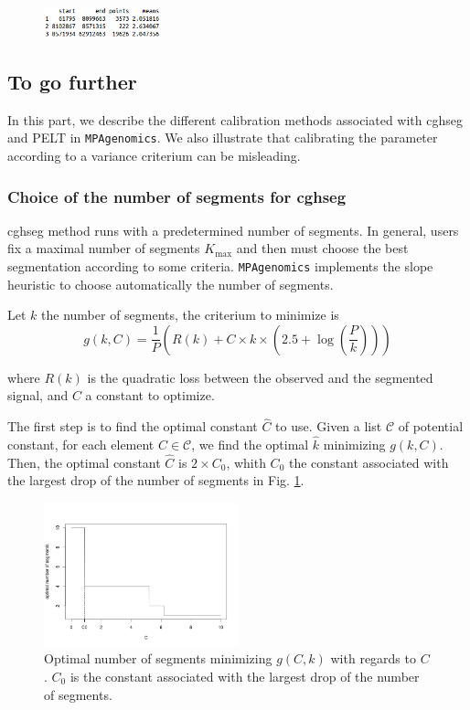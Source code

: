 \documentclass[a4paper,10pt]{article}
\begin{document}
		\begin{figure}[!h]
			\includegraphics[width=0.3\textwidth]{fig/outpelt2}
		\end{figure}
		
		
    \subsection{To go further}
      \label{sec:togo}
        In this part, we describe the different calibration methods associated with cghseg and PELT in \texttt{MPAgenomics}. We also illustrate that calibrating the parameter according to a variance criterium can be misleading.
        
  
      \subsubsection{Choice of the number of segments for cghseg}
        cghseg method runs with a predetermined number of segments. In general, users fix a maximal number of segments $K_{\max}$ and then must choose the best segmentation according to some criteria. \texttt{MPAgenomics} implements the slope heuristic \cite{heurpente} to choose automatically the number of segments. 
      
        Let $k$ the number of segments, the criterium \cite{penseg} to minimize is 
        $$g(k,C)=\frac{1}{P}\left(R(k)+C\times k \times \left(2.5+\log(\frac{P}{k})\right)\right) $$
      
        where $R(k)$ is the quadratic loss between the observed and the segmented signal, and $C$ a constant to optimize.
      
        The first step is to find the optimal constant $\hat{C}$ to use. Given a list $\mathcal{C}$ of potential constant, for each element $C\in\mathcal{C}$, we find the optimal $\hat{k}$ minimizing $g(k,C)$. Then, the optimal constant $\hat{C}$ is $2\times C_0$, whith $C_0$ the constant associated with the largest drop of the number of segments in Fig. \ref{fig:slopeheuristic}.  
      
        \begin{figure}[!h]
          \centering
  	      \includegraphics[width=0.5\textwidth]{fig/slopeheuristic}
		      \caption{Optimal number of segments minimizing $g(C,k)$ with regards to $C$. $C_0$ is the constant associated with the largest drop of the number of segments.}
		      \label{fig:slopeheuristic}
        \end{figure}
      
\end{document}
